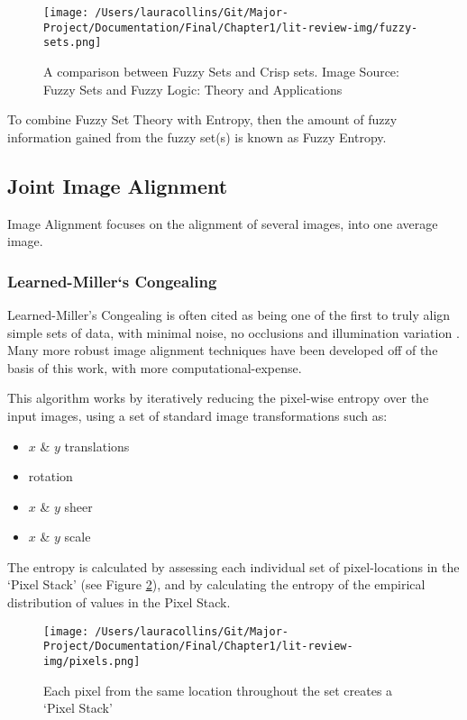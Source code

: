 \begin{figure}[H]
  \center
  \texttt{[image: /Users/lauracollins/Git/Major-Project/Documentation/Final/Chapter1/lit-review-img/fuzzy-sets.png]}
  \caption{A comparison between Fuzzy Sets and Crisp sets. Image Source: Fuzzy Sets and Fuzzy Logic: Theory and Applications \cite{GEORGE_J_BO_2008}}
  \label{fig:fuzzy-sets}
\end{figure}

To combine Fuzzy Set Theory with Entropy, then the amount of fuzzy information gained from the fuzzy set(s) is known as Fuzzy Entropy.

\subsection{Joint Image Alignment}

Image Alignment focuses on the alignment of several images, into one average image.

\subsubsection{Learned-Miller`s Congealing}

Learned-Miller's Congealing \cite{joint-alignment} is often cited as being one of the first to truly align simple sets of data, with minimal noise, no occlusions and illumination variation \cite{Zhou_Lee_Yu_Efros_2015} \cite{peng2012rasl} \cite{Peng_Ganesh_Wright_Xu_Ma_2012}. Many more robust image alignment techniques have been developed off of the basis of this work, with more computational-expense.

This algorithm works by iteratively reducing the pixel-wise entropy over the input images, using a set of standard image transformations such as:

\begin{itemize}
  \item $x$ \& $y$ translations
  \item rotation
  \item $x$ \& $y$ sheer
  \item $x$ \& $y$ scale
\end{itemize}

The entropy is calculated by assessing each individual set of pixel-locations in the `Pixel Stack' (see Figure \ref{fig:pixel-stack}), and by calculating the entropy of the empirical distribution of values in the Pixel Stack.

\begin{figure}[H]
  \center
  \texttt{[image: /Users/lauracollins/Git/Major-Project/Documentation/Final/Chapter1/lit-review-img/pixels.png]}
  \caption{Each pixel from the same location throughout the set creates a `Pixel Stack'}
  \label{fig:pixel-stack}
\end{figure}

